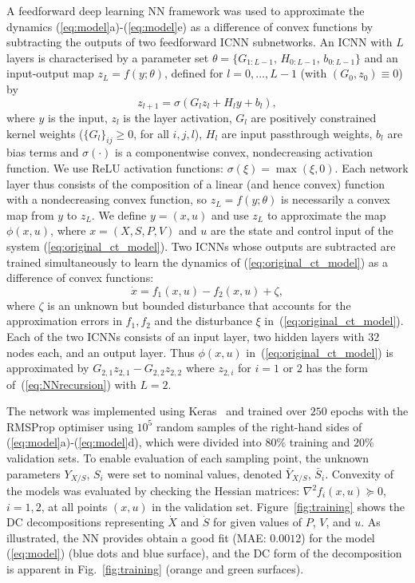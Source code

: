 \documentclass[final,5p,times,twocolumn,authoryear]{elsarticle}
\begin{document}
A feedforward deep learning NN framework was used to approximate the dynamics (\ref{eq:model}a)-(\ref{eq:model}e) as a difference of convex functions by subtracting the outputs of two feedforward ICNN subnetworks. An ICNN with $L$ layers is characterised by a parameter set
$\theta = \{ G_{1:L-1}, \, H_{0:L-1}, \, b_{0:L-1} \}$
and an input-output map $z_L= f(y; \theta)$, defined for $l = 0,\ldots ,L-1$ (with $(G_0, z_0) \equiv 0$) by
\begin{equation}\label{eq:NNrecursion}
z_{l+1} = \sigma(G_l z_l + H_l y + b_l) ,
\end{equation}
where $y$ is the input, $z_l$ is the layer activation, $G_l$ are positively constrained kernel weights ($\{G_l\}_{ij} \geq 0$, for all $i,j,l$),
$H_l$ are input passthrough weights, $b_l$ are bias terms and $\sigma(\cdot)$ is a componentwise convex, nondecreasing activation function. 
We use ReLU activation functions: $\sigma(\xi) = \max(\xi,0)$. 
Each network layer thus consists of the composition of a linear (and hence convex) function with a nondecreasing convex function, so $z_{L}= f(y;\theta)$ is necessarily a convex map from $y$ to $z_L$. We define $y=(x,u)$ and use $z_{L}$ to approximate the map $\phi(x,u)$, where $x=(X,S,P,V)$ and $u$ are the state and control input of the system (\ref{eq:original_ct_model}). Two ICNNs whose outputs are subtracted are trained simultaneously to learn the dynamics of (\ref{eq:original_ct_model}) as a difference of convex functions:
\begin{equation}\label{eq:dc_ct_model}
  \dot{x} = f_1(x,u) - f_2(x,u) + \zeta,
\end{equation}
where $\zeta$ is an unknown but bounded disturbance that accounts for the approximation errors in $f_1,f_2$ and the disturbance $\xi$ in~(\ref{eq:original_ct_model}).
%
Each of the two ICNNs consists of an input layer, two hidden layers with $32$ nodes each, and an output layer. Thus $\phi(x,u)$ in~(\ref{eq:original_ct_model}) is approximated by $G_{2,1} z_{2,1}- G_{2,2} z_{2,2}$ where $z_{2,i}$ for $i=1$ or $2$ has the form of~(\ref{eq:NNrecursion}) with $L=2$. 

The network was implemented using Keras~\citep{chollet15:keras} and trained over $250$ epochs with the RMSProp optimiser using $10^5$ random samples of
the right-hand sides of (\ref{eq:model}a)-(\ref{eq:model}d),
which were divided into $80\%$ training and $20\%$ validation sets.
%
To enable evaluation of
each sampling point, the unknown parameters $Y_{X/S}$, $S_i$ were set to nominal values, denoted 
$\bar{Y}_{X/S}$, $\bar{S}_i$.
%
Convexity of the models was evaluated by checking the Hessian matrices: $\nabla^2 f_i (x, u) \succeq 0$, $i=1,2$, at all points $(x,u)$ in the validation set. Figure~\ref{fig:training} shows the DC decompositions representing $\dot{X}$ and $\dot{S}$ for
given values of $P$, $V$, and $u$.
As illustrated, the NN provides obtain a good fit (MAE: $0.0012$) for the model (\ref{eq:model}) (blue dots and blue surface), and the DC form of the decomposition is apparent in Fig.~\ref{fig:training} (orange and green surfaces).   
\end{document}
